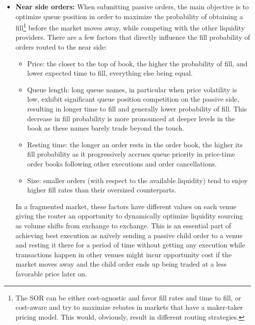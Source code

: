 \begin{itemize}
\item \textbf{Near side orders:} When submitting passive orders, the main objective is to optimize queue position in order to maximize the probability of obtaining a fill\footnote{The SOR can be either cost-agnostic and favor fill rates and time to fill, or cost-aware and try to maximize rebates in markets that have a maker-taker pricing model. This would, obviously, result in different routing strategies.} before the market moves away, while competing with the other liquidity providers. There are a few factors that directly influence the fill probability of orders routed to the near side:


\begin{itemize}
\item Price: the closer to the top of book, the higher the probability of fill, and lower expected time to fill, everything else being equal.

\item Queue length: long queue names, in particular when price volatility is low, exhibit significant queue position competition on the passive side, resulting in longer time to fill and generally lower probability of fill. This decrease in fill probability is more pronounced at deeper levels in the book as these names barely trade beyond the touch. 

\item Resting time: the longer an order rests in the order book, the higher its fill probability as it progressively accrues queue priority in price-time order books following other executions and order cancellations.

\item Size: smaller orders (with respect to the available liquidity) tend to enjoy higher fill rates than their oversized counterparts.
\end{itemize}


In a fragmented market, these factors have different values on each venue giving the router an opportunity to dynamically optimize liquidity sourcing as volume shifts from exchange to exchange. This is an essential part of achieving best execution as na\"ively  sending a passive child order to a venue and resting it there for a period of time without getting any execution while transactions happen in other venues might incur opportunity cost if the market moves away and the child order ends up being traded at a less favorable price later on. \twomedskip



\end{itemize}
